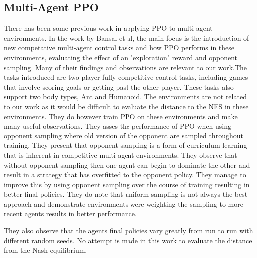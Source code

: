 \documentclass[conference]{IEEEtran}
\begin{document}

\subsection{Multi-Agent PPO}

There has been some previous work in applying PPO to multi-agent environments. In the work by Bansal et al\cite{balduzzi2019open}, the main focus is the introduction of new competative multi-agent control tasks and how PPO performs in these environments, evaluating the effect of an "exploration" reward and opponent sampling. Many of their findings and observations are relevant to our work.The tasks introduced are two player fully competitive control tasks, including games that involve scoring goals or getting past the other player. These tasks also support two body types, Ant and Humanoid. The environments are not related to our work as it would be difficult to evaluate the distance to the NES in these environments. They do however train PPO on these environments and make many useful observations. They asses the performance of PPO when using opponent sampling where old version of the opponent are sampled throughout training. They present that opponent sampling is a form of curriculum learning that is inherent in competitive multi-agent environments. They observe that without opponent sampling then one agent can begin to dominate the other and result in a strategy that has overfitted to the opponent policy. They manage to improve this by using opponent sampling over the course of training resulting in better final policies. They do note that uniform sampling is not always the best approach and demonstrate environments were weighting the sampling to more recent agents results in better performance.

They also observe that the agents final policies vary greatly from run to run with different random seeds. No attempt is made in this work to evaluate the distance from the Nash equilibrium. 
\end{document}
